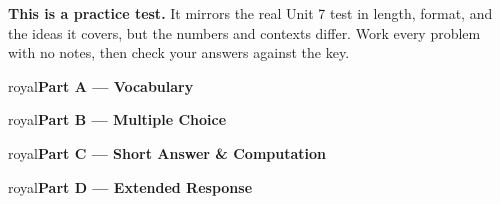 \documentclass[10pt]{article}
\newcommand{\parthead}[1]{%
  \vspace{6pt}\noindent
  \begin{headlinebox}{royal}{\color{white}\bfseries #1}\end{headlinebox}%
  \vspace{4pt}}
\begin{document}
\namedateperiod

\vspace{0.10in}
\begin{remindbox}
\small
\textbf{This is a practice test.} It mirrors the real Unit 7 test in length, format,
and the ideas it covers, but the numbers and contexts differ. Work every problem
with no notes, then check your answers against the key.
\end{remindbox}

\parthead{Part A --- Vocabulary}

\parthead{Part B --- Multiple Choice}

\parthead{Part C --- Short Answer \& Computation}

\parthead{Part D --- Extended Response}
\end{document}
